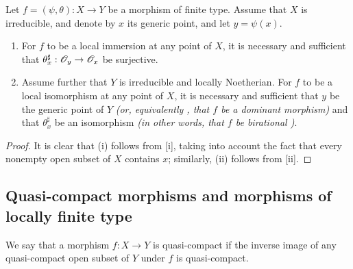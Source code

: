 \begin{cor}[6.5.5]
\label{1.6.5.5}
Let $f=(\psi,\theta):X\to Y$ be a morphism of finite type.
Assume that $X$ is irreducible, and denote by $x$ its generic point, and let $y=\psi(x)$.
\begin{enumerate}[label=\emph{(\roman*)}]
  \item For $f$ to be a local immersion at any point of $X$, it is necessary and sufficient that $\theta_x^\sharp:\mathscr{O}_y\to\mathscr{O}_x$ be surjective.
  \item Assume further that $Y$ is irreducible and locally Noetherian.
    For $f$ to be a local isomorphism at any point of $X$, it is necessary and sufficient that $y$ be the generic point of $Y$ \emph{(or, equivalently , that $f$ be a \emph{dominant} morphism)} and that $\theta_x^\sharp$ be an isomorphism \emph{(in other words, that $f$ be \emph{birational} )}.
\end{enumerate}
\end{cor}

\begin{proof}
\label{proof-1.6.5.5}
It is clear that (i) follows from [i], taking into account the fact that every nonempty open subset of $X$ contains $x$;
similarly, (ii) follows from [ii].
\end{proof}

\subsection{Quasi-compact morphisms and morphisms of locally finite type}
\label{subsection-quasi-compact-morphisms-and-morphisms-of-locally-finite-type}

\begin{defn}[6.6.1]
We say that a morphism $f\colon X\to Y$ is quasi-compact if the inverse image of any quasi-compact open subset of $Y$ under $f$ is quasi-compact.
\end{defn}
